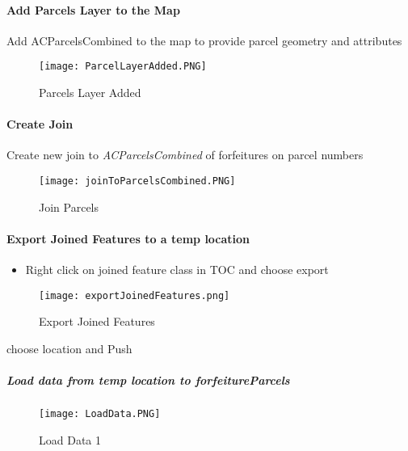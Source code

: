  \paragraph{Add Parcels Layer to the Map}

 Add ACParcelsCombined to the map to provide parcel geometry and attributes
 \vspace{.25in}

 \begin{figure}[h!]
 \centering
     \texttt{[image: ParcelLayerAdded.PNG]}
 \caption{Parcels Layer Added}
 \end{figure}
 \clearpage
 \paragraph{Create Join}
 \vspace{.3in}

 Create new join to \emph{ACParcelsCombined} of forfeitures on parcel numbers
 \vspace{.25in}

 \begin{figure}[h!]
 \centering
     \texttt{[image: joinToParcelsCombined.PNG]}
 \caption{Join Parcels}
 \end{figure}
 \clearpage
 \paragraph[Export Joined Features]{Export Joined Features to a temp location \texorpdfstring{\\}{}}
 \begin{itemize}
 \item Right click {{\rtArrow}}  on joined feature class in TOC and choose export
\end{itemize}
 \begin{figure}[h!]
 \centering
     \texttt{[image: exportJoinedFeatures.png]}
 \caption{Export Joined Features}
 \end{figure}
 {\bigbtn choose location and Push }
 \clearpage
 \subparagraph[Load data to forfeitureParcels]{\Large Load data from temp location to forfeitureParcels}
 \subparagraph*{}
 \begin{figure}[h!]
 \centering
     \texttt{[image: LoadData.PNG]}
 \caption{Load Data 1}
 \end{figure}
 \clearpage


